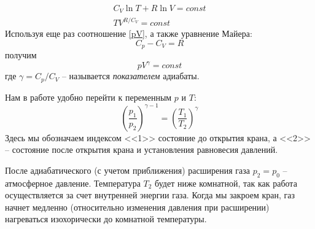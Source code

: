 \documentclass[a4paper,12pt]{report}
\begin{document}
        \begin{eqnarray}
            C_V\ln T+R\ln V=const\\ 
            TV^{R/C_V}=const
        \end{eqnarray}
        Используя еще раз соотношение \eqref{pV}, а также уравнение Майера:
        \begin{equation}
            \label{Mayer}
            C_p-C_V=R
        \end{equation}
        получим
        \begin{equation}
            \label{final gamma}
            pV^\gamma=const
        \end{equation}
        где $\gamma=C_p/C_V$ -- называется \emph{показателем} адиабаты.

        Нам в работе удобно перейти к переменным $p$ и $T$:
        \begin{equation}
            \label{pT-final}
            \left( \frac{p_1}{p_2} \right)^{\gamma-1}=\left( \frac{T_1}{T_2} \right)^\gamma
        \end{equation}
        Здесь мы обозначаем индексом <<1>> состояние до открытия крана, а <<2>> -- состояние после открытия крана и установления равновесия давлений. 
        
        После адиабатического (с учетом приближения) расширения газа $p_2=p_0$ -- атмосферное давление. Температура $T_2$ будет ниже комнатной, так как работа осуществляется за счет внутренней энергии газа. Когда мы закроем кран, газ начнет медленно (относительно изменения давления при расширении) нагреваться изохорически до комнатной температуры.
        
\end{document}
